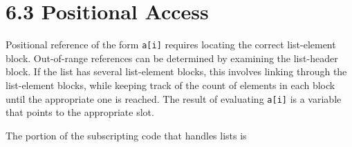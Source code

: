 \section[6.3 Positional Access]{6.3 Positional Access}

Positional reference of the form \texttt{a[i]} requires locating the
correct list-element block. Out-of-range references can be determined
by examining the list-header block. If the list has several
list-element blocks, this involves linking through the list-element
blocks, while keeping track of the count of elements in each block
until the appropriate one is reached. The result of evaluating
\texttt{a[i]} is a variable that points to the appropriate slot.

The portion of the subscripting code that handles lists is

\goodbreak
